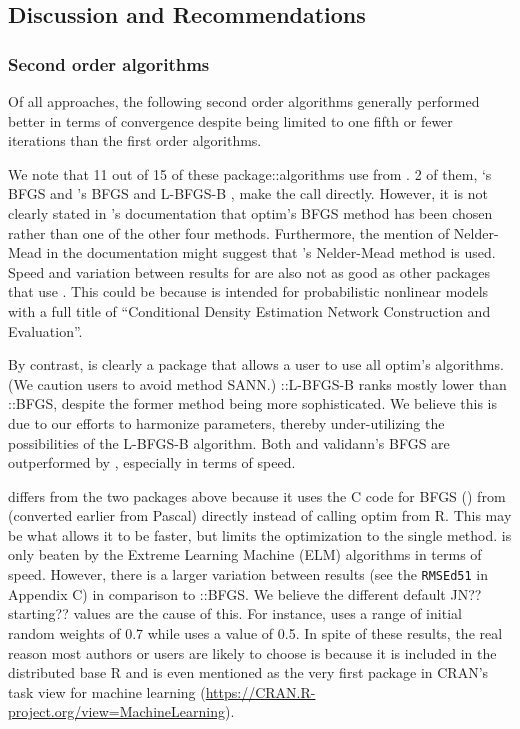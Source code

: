 \hypertarget{discussion-and-recommendations}{%
\subsection{Discussion and
Recommendations}\label{discussion-and-recommendations}}

\hypertarget{second-order-algorithms}{%
\subsubsection{Second order algorithms}\label{second-order-algorithms}}

Of all approaches, the following second order algorithms generally
performed better in terms of convergence despite being limited to one
fifth or fewer iterations than the first order algorithms.

We note that 11 out of 15 of these package::algorithms use 
from . 2 of them, `s BFGS
\citep{R-CaDENCE} and 's BFGS and L-BFGS-B
\citep{R-validann}, make the call directly. However, it is not clearly
stated in 's documentation that optim's BFGS method has
been chosen rather than one of the other four methods. Furthermore, the
mention of Nelder-Mead in the documentation might suggest that
's Nelder-Mead method is used. Speed and variation between
results for  are also not as good as other packages
that use . This could be because  is
intended for probabilistic nonlinear models with a full title of
``Conditional Density Estimation Network Construction and Evaluation''.

By contrast,  is clearly a package that allows a user
to use all optim's algorithms. (We caution users to avoid method SANN.)
::L-BFGS-B ranks mostly lower than
::BFGS, despite the former method being more
sophisticated. We believe this is due to our efforts to harmonize
parameters, thereby under-utilizing the possibilities of the L-BFGS-B
algorithm. Both  and validann's BFGS are outperformed
by , especially in terms of speed.

 \citep{R-nnet} differs from the two packages above
because it uses the C code for BFGS () from 
(converted earlier from Pascal) directly instead of calling optim from
R. This may be what allows it to be faster, but limits the optimization
to the single method.  is only beaten by the Extreme
Learning Machine (ELM) algorithms in terms of speed. However, there is a
larger variation between results (see the \texttt{RMSEd51} in Appendix
C) in comparison to ::BFGS. We believe the different
default JN?? starting?? values are the cause of this. For instance,
 uses a range of initial random weights of 0.7 while
 uses a value of 0.5. In spite of these results, the
real reason most authors or users are likely to choose  is
because it is included in the distributed base R and is even mentioned
as the very first package in CRAN's task view for machine learning
(\url{https://CRAN.R-project.org/view=MachineLearning}).


